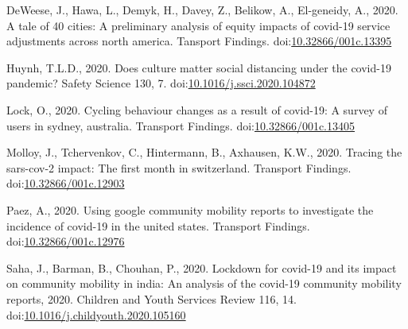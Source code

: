 \documentclass[]{elsarticle} %
\begin{document}
\leavevmode\hypertarget{ref-DeWeese2020tale}{}%
DeWeese, J., Hawa, L., Demyk, H., Davey, Z., Belikow, A., El-geneidy,
A., 2020. A tale of 40 cities: A preliminary analysis of equity impacts
of covid-19 service adjustments across north america. Tansport Findings.
doi:\href{https://doi.org/10.32866/001c.13395}{10.32866/001c.13395}

\leavevmode\hypertarget{ref-Huynh2020culture}{}%
Huynh, T.L.D., 2020. Does culture matter social distancing under the
covid-19 pandemic? Safety Science 130, 7.
doi:\href{https://doi.org/10.1016/j.ssci.2020.104872}{10.1016/j.ssci.2020.104872}

\leavevmode\hypertarget{ref-Lock2020cycling}{}%
Lock, O., 2020. Cycling behaviour changes as a result of covid-19: A
survey of users in sydney, australia. Transport Findings.
doi:\href{https://doi.org/10.32866/001c.13405}{10.32866/001c.13405}

\leavevmode\hypertarget{ref-Molloy2020tracing}{}%
Molloy, J., Tchervenkov, C., Hintermann, B., Axhausen, K.W., 2020.
Tracing the sars-cov-2 impact: The first month in switzerland. Transport
Findings.
doi:\href{https://doi.org/10.32866/001c.12903}{10.32866/001c.12903}

\leavevmode\hypertarget{ref-Paez2020using}{}%
Paez, A., 2020. Using google community mobility reports to investigate
the incidence of covid-19 in the united states. Transport Findings.
doi:\href{https://doi.org/10.32866/001c.12976}{10.32866/001c.12976}

\leavevmode\hypertarget{ref-Saha2020lockdown}{}%
Saha, J., Barman, B., Chouhan, P., 2020. Lockdown for covid-19 and its
impact on community mobility in india: An analysis of the covid-19
community mobility reports, 2020. Children and Youth Services Review
116, 14.
doi:\href{https://doi.org/10.1016/j.childyouth.2020.105160}{10.1016/j.childyouth.2020.105160}
\end{document}
